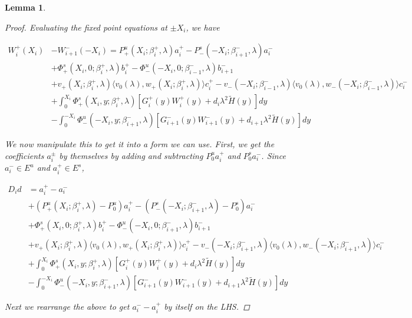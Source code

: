 \documentclass[12pt]{article}
\newtheorem{lemma}{Lemma}
\begin{document}
\begin{lemma}
\begin{proof}

Evaluating the fixed point equations at $\pm X_i$, we have

\begin{align*}
W_i^+(X_i) &- W_{i+1}^-(-X_i) = P^u_+(X_i; \beta_i^+, \lambda) a_i^+ - P^s_-(-X_i; \beta_{i+1}^-, \lambda) a_i^- \\
&+ \Phi^s_+(X_i, 0; \beta_i^+, \lambda)b_i^+ - \Phi^u_-(-X_i, 0; \beta_{i-1}^-, \lambda)b_{i+1}^- \\
&+ v_+(X_i; \beta_i^+, \lambda) \langle v_0(\lambda), w_+(X_i; \beta_i^+, \lambda) \rangle c_i^+ - v_-(-X_i; \beta_{i-1}^-, \lambda) \langle v_0(\lambda), w_-(-X_i; \beta_{i-1}^-, \lambda) \rangle c_i^- \\
&+ \int_0^{X_i} \Phi^s_+(X_i, y; \beta_i^+, \lambda) [ G_i^+(y) W_i^+(y) + d_i \lambda^2 \tilde{H}(y) ] dy \\
&- \int_0^{-X_i} \Phi^u_-(-X_i, y; \beta_{i+1}^-, \lambda) [ G_{i+1}^-(y) W_{i+1}^-(y) + d_{i+1} \lambda^2 \tilde{H}(y) ] dy
\end{align*}

We now manipulate this to get it into a form we can use. First, we get the coefficients $a_i^\pm$ by themselves by adding and subtracting $P_0^u a_i^+$ and $P_0^s a_i^-$. Since $a_i^- \in E^u$ and $a_i^+ \in E^s$, 

\begin{align*}
D_i d &= a_i^+ - a_i^- \\
&+ (P^u_+(X_i; \beta_i^+, \lambda) - P_0^u)a_i^+ - (P^s_-(-X_i; \beta_{i+1}^-, \lambda) - P_0^s)a_i^- \\
&+ \Phi^s_+(X_i, 0; \beta_i^+, \lambda)b_i^+ - \Phi^u_-(-X_i, 0; \beta_{i+1}^-, \lambda)b_{i+1}^- \\
&+ v_+(X_i; \beta_i^+, \lambda) \langle v_0(\lambda), w_+(X_i; \beta_i^+, \lambda) \rangle c_i^+ - v_-(-X_i; \beta_{i+1}^-, \lambda) \langle v_0(\lambda), w_-(-X_i; \beta_{i+1}^-, \lambda) \rangle c_i^- \\
&+ \int_0^{X_i} \Phi^s_+(X_i, y; \beta_i^+, \lambda) [ G_i^+(y) W_i^+(y) + d_i \lambda^2 \tilde{H}(y) ] dy \\
&- \int_0^{-X_i} \Phi^u_-(-X_i, y; \beta_{i+1}^-, \lambda) [ G_{i+1}^-(y) W_{i+1}^-(y) + d_{i+1} \lambda^2 \tilde{H}(y) ] dy
\end{align*}

Next we rearrange the above to get $a_i^- - a_i^+$ by itself on the LHS.


\end{proof}
\end{lemma}
\end{document}
